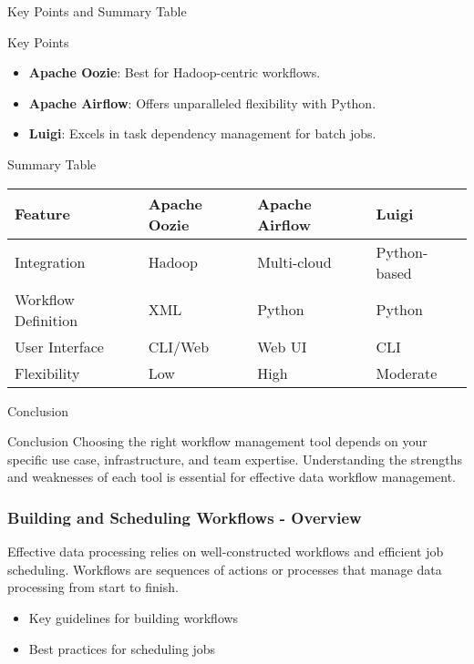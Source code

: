 \documentclass[aspectratio=169]{beamer}
\begin{document}
\begin{frame}[fragile]{Key Points and Summary Table}
    \begin{block}{Key Points}
        \begin{itemize}
            \item \textbf{Apache Oozie}: Best for Hadoop-centric workflows.
            \item \textbf{Apache Airflow}: Offers unparalleled flexibility with Python.
            \item \textbf{Luigi}: Excels in task dependency management for batch jobs.
        \end{itemize}
    \end{block}

    \begin{block}{Summary Table}
        \begin{tabular}{|l|l|l|l|}
            \hline
            \textbf{Feature} & \textbf{Apache Oozie} & \textbf{Apache Airflow} & \textbf{Luigi} \\ \hline
            Integration & Hadoop & Multi-cloud & Python-based \\ \hline
            Workflow Definition & XML & Python & Python \\ \hline
            User Interface & CLI/Web & Web UI & CLI \\ \hline
            Flexibility & Low & High & Moderate \\ \hline
        \end{tabular}
    \end{block}
\end{frame}

\begin{frame}[fragile]{Conclusion}
    \begin{block}{Conclusion}
        Choosing the right workflow management tool depends on your specific use case, infrastructure, and team expertise. Understanding the strengths and weaknesses of each tool is essential for effective data workflow management.
    \end{block}
\end{frame}

\begin{frame}[fragile]
    \frametitle{Building and Scheduling Workflows - Overview}
    Effective data processing relies on well-constructed workflows and efficient job scheduling. Workflows are sequences of actions or processes that manage data processing from start to finish. 
    \begin{itemize}
        \item Key guidelines for building workflows
        \item Best practices for scheduling jobs
    \end{itemize}
\end{frame}
\end{document}
